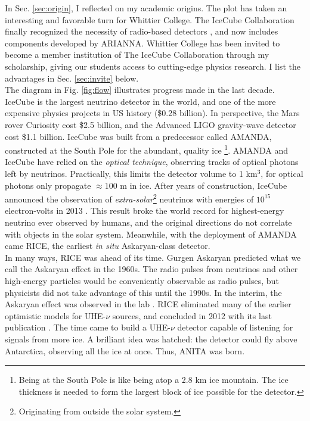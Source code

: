 \documentclass[../../../main.tex]{subfiles}
\begin{document}
In Sec. \ref{sec:origin}, I reflected on my academic origins.  The plot has taken an interesting and favorable turn for Whittier College.  The IceCube Collaboration finally recognized the necessity of radio-based detectors \cite{PhysRevD.98.062003}, and now includes components developed by ARIANNA.  Whittier College has been invited to become a member institution of The IceCube Collaboration through my scholarship, giving our students access to cutting-edge physics research.  I list the advantages in Sec. \ref{sec:invite} below.
\\
\vspace{0.15cm}
The diagram in Fig. \ref{fig:flow} illustrates progress made in the last decade.  IceCube is the largest neutrino detector in the world, and one of the more expensive physics projects in US history (\$0.28 billion).  In perspective, the Mars rover Curiosity cost \$2.5 billion, and the Advanced LIGO gravity-wave detector cost \$1.1 billion.  IceCube was built from a predecessor called AMANDA, constructed at the South Pole for the abundant, quality ice \footnote{Being at the South Pole is like being atop a 2.8 km ice mountain.  The ice thickness is needed to form the largest block of ice possible for the detector.}.  AMANDA and IceCube have relied on the \textit{optical technique}, observing tracks of optical photons left by neutrinos.  Practically, this limits the detector volume to 1 km$^3$, for optical photons only propagate $\approx 100$ m in ice.  After years of construction, IceCube announced the observation of \textit{extra-solar}\footnote{Originating from outside the solar system.} neutrinos with energies of $10^{15}$ electron-volts in 2013 \cite{PhysRevLett.111.021103}.  This result broke the world record for highest-energy neutrino ever observed by humans, and the original directions do not correlate with objects in the solar system.  Meanwhile, with the deployment of AMANDA came RICE, the earliest \textit{in situ} Askaryan-class detector.
\\
\vspace{0.15cm}
In many ways, RICE was ahead of its time.  Gurgen Askaryan predicted what we call the Askaryan effect in the 1960s.  The radio pulses from neutrinos and other high-energy particles would be conveniently observable as radio pulses, but physicists did not take advantage of this until the 1990s.  In the interim, the Askaryan effect was observed in the lab \cite{PhysRevLett.86.2802} \cite{PhysRevLett.99.171101}. RICE eliminated many of the earlier optimistic models for UHE-$\nu$ sources, and concluded in 2012 with its last publication \cite{PhysRevD.85.062004}.  The time came to build a UHE-$\nu$ detector capable of listening for signals from more ice.  A brilliant idea was hatched: the detector could fly above Antarctica, observing all the ice at once.  Thus, ANITA was born.
\end{document}
